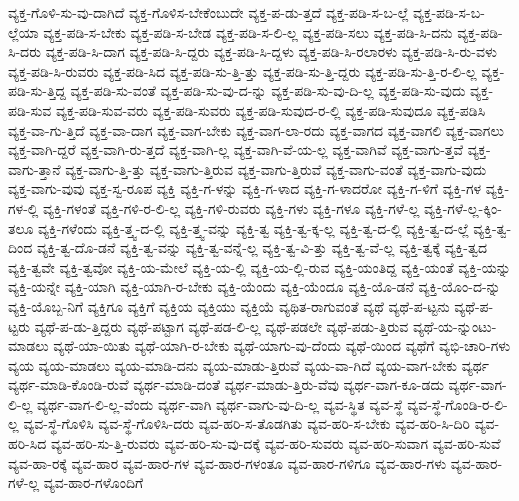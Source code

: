 {ವ್ಯಕ್ತ-ಗೊಳಿ-ಸು-ವು-ದಾಗಿದೆ
ವ್ಯಕ್ತ-ಗೊಳಿಸ-ಬೇಕೆಂಬುದೇ
ವ್ಯಕ್ತ-ಪ-ಡು-ತ್ತದೆ
ವ್ಯಕ್ತ-ಪಡಿ-ಸ-ಬ-ಲ್ಲೆ
ವ್ಯಕ್ತ-ಪಡಿ-ಸ-ಬ-ಲ್ಲೆಯಾ
ವ್ಯಕ್ತ-ಪಡಿ-ಸ-ಬೇಕು
ವ್ಯಕ್ತ-ಪಡಿ-ಸ-ಬೇಡ
ವ್ಯಕ್ತ-ಪಡಿ-ಸ-ಲಿ-ಲ್ಲ
ವ್ಯಕ್ತ-ಪಡಿ-ಸಲು
ವ್ಯಕ್ತ-ಪಡಿ-ಸಿ-ದನು
ವ್ಯಕ್ತ-ಪಡಿ-ಸಿ-ದರು
ವ್ಯಕ್ತ-ಪಡಿ-ಸಿ-ದಾಗ
ವ್ಯಕ್ತ-ಪಡಿ-ಸಿ-ದ್ದರು
ವ್ಯಕ್ತ-ಪಡಿ-ಸಿ-ದ್ದಳು
ವ್ಯಕ್ತ-ಪಡಿ-ಸಿ-ರಲಾರಳು
ವ್ಯಕ್ತ-ಪಡಿ-ಸಿ-ರು-ವಳು
ವ್ಯಕ್ತ-ಪಡಿ-ಸಿ-ರುವರು
ವ್ಯಕ್ತ-ಪಡಿ-ಸಿದ
ವ್ಯಕ್ತ-ಪಡಿ-ಸು-ತ್ತಿ-ತ್ತು
ವ್ಯಕ್ತ-ಪಡಿ-ಸು-ತ್ತಿ-ದ್ದರು
ವ್ಯಕ್ತ-ಪಡಿ-ಸು-ತ್ತಿ-ರ-ಲಿ-ಲ್ಲ
ವ್ಯಕ್ತ-ಪಡಿ-ಸು-ತ್ತಿದ್ದ
ವ್ಯಕ್ತ-ಪಡಿ-ಸು-ವಂತೆ
ವ್ಯಕ್ತ-ಪಡಿ-ಸು-ವು-ದ-ನ್ನು
ವ್ಯಕ್ತ-ಪಡಿ-ಸು-ವು-ದಿ-ಲ್ಲ
ವ್ಯಕ್ತ-ಪಡಿ-ಸು-ವುದು
ವ್ಯಕ್ತ-ಪಡಿ-ಸುವ
ವ್ಯಕ್ತ-ಪಡಿ-ಸುವ-ವರು
ವ್ಯಕ್ತ-ಪಡಿ-ಸುವರು
ವ್ಯಕ್ತ-ಪಡಿ-ಸುವುದ-ರ-ಲ್ಲಿ
ವ್ಯಕ್ತ-ಪಡಿ-ಸುವುದೂ
ವ್ಯಕ್ತ-ಪಡಿಸಿ
ವ್ಯಕ್ತ-ವಾ-ಗು-ತ್ತಿದೆ
ವ್ಯಕ್ತ-ವಾ-ದಾಗ
ವ್ಯಕ್ತ-ವಾಗ-ಬೇಕು
ವ್ಯಕ್ತ-ವಾಗ-ಲಾ-ರದು
ವ್ಯಕ್ತ-ವಾಗದ
ವ್ಯಕ್ತ-ವಾಗಲಿ
ವ್ಯಕ್ತ-ವಾಗಲು
ವ್ಯಕ್ತ-ವಾಗಿ-ದ್ದರೆ
ವ್ಯಕ್ತ-ವಾಗಿ-ರು-ತ್ತದೆ
ವ್ಯಕ್ತ-ವಾಗಿ-ಲ್ಲ
ವ್ಯಕ್ತ-ವಾಗಿ-ವೆ-ಯ-ಲ್ಲ
ವ್ಯಕ್ತ-ವಾಗಿವೆ
ವ್ಯಕ್ತ-ವಾಗು-ತ್ತವೆ
ವ್ಯಕ್ತ-ವಾಗು-ತ್ತಾನೆ
ವ್ಯಕ್ತ-ವಾಗು-ತ್ತಿ-ತ್ತು
ವ್ಯಕ್ತ-ವಾಗು-ತ್ತಿರುವ
ವ್ಯಕ್ತ-ವಾಗು-ತ್ತಿರುವೆ
ವ್ಯಕ್ತ-ವಾಗು-ವಂತೆ
ವ್ಯಕ್ತ-ವಾಗು-ವುದು
ವ್ಯಕ್ತ-ವಾಗು-ವುವು
ವ್ಯಕ್ತ-ಸ್ವ-ರೂಪ
ವ್ಯಕ್ತಿ
ವ್ಯಕ್ತಿ-ಗ-ಳನ್ನು
ವ್ಯಕ್ತಿ-ಗ-ಳಾದ
ವ್ಯಕ್ತಿ-ಗ-ಳಾದರೋ
ವ್ಯಕ್ತಿ-ಗ-ಳಿಗೆ
ವ್ಯಕ್ತಿ-ಗಳ
ವ್ಯಕ್ತಿ-ಗಳ-ಲ್ಲಿ
ವ್ಯಕ್ತಿ-ಗಳಂತೆ
ವ್ಯಕ್ತಿ-ಗಳಿ-ರ-ಲಿ-ಲ್ಲ
ವ್ಯಕ್ತಿ-ಗಳಿ-ರುವರು
ವ್ಯಕ್ತಿ-ಗಳು
ವ್ಯಕ್ತಿ-ಗಳೂ
ವ್ಯಕ್ತಿ-ಗಳೆ-ಲ್ಲ
ವ್ಯಕ್ತಿ-ಗಳೆ-ಲ್ಲ-ಕ್ಕಿಂ-ತಲೂ
ವ್ಯಕ್ತಿ-ಗಳೆಂದು
ವ್ಯಕ್ತಿ-ತ್ತ್ವ-ದ-ಲ್ಲಿ
ವ್ಯಕ್ತಿ-ತ್ತ್ವ-ವನ್ನು
ವ್ಯಕ್ತಿ-ತ್ವ
ವ್ಯಕ್ತಿ-ತ್ವ-ಕ್ಕ-ಲ್ಲ
ವ್ಯಕ್ತಿ-ತ್ವ-ದ-ಲ್ಲಿ
ವ್ಯಕ್ತಿ-ತ್ವ-ದ-ಲ್ಲೆ
ವ್ಯಕ್ತಿ-ತ್ವ-ದಿಂದ
ವ್ಯಕ್ತಿ-ತ್ವ-ದೊ-ಡನೆ
ವ್ಯಕ್ತಿ-ತ್ವ-ವನ್ನು
ವ್ಯಕ್ತಿ-ತ್ವ-ವನ್ನೆ-ಲ್ಲ
ವ್ಯಕ್ತಿ-ತ್ವ-ವಿ-ತ್ತು
ವ್ಯಕ್ತಿ-ತ್ವ-ವೆ-ಲ್ಲ
ವ್ಯಕ್ತಿ-ತ್ವಕ್ಕೆ
ವ್ಯಕ್ತಿ-ತ್ವದ
ವ್ಯಕ್ತಿ-ತ್ವವೇ
ವ್ಯಕ್ತಿ-ತ್ವವೋ
ವ್ಯಕ್ತಿ-ಯ-ಮೇಲೆ
ವ್ಯಕ್ತಿ-ಯ-ಲ್ಲಿ
ವ್ಯಕ್ತಿ-ಯ-ಲ್ಲಿ-ರುವ
ವ್ಯಕ್ತಿ-ಯಂತಿದ್ದ
ವ್ಯಕ್ತಿ-ಯಂತೆ
ವ್ಯಕ್ತಿ-ಯನ್ನು
ವ್ಯಕ್ತಿ-ಯನ್ನೇ
ವ್ಯಕ್ತಿ-ಯಾಗಿ
ವ್ಯಕ್ತಿ-ಯಾಗಿ-ರ-ಬೇಕು
ವ್ಯಕ್ತಿ-ಯೆಂದು
ವ್ಯಕ್ತಿ-ಯೆಂದೂ
ವ್ಯಕ್ತಿ-ಯೊ-ಡನೆ
ವ್ಯಕ್ತಿ-ಯೊಂ-ದ-ನ್ನು
ವ್ಯಕ್ತಿ-ಯೊಬ್ಬ-ನಿಗೆ
ವ್ಯಕ್ತಿಗೂ
ವ್ಯಕ್ತಿಗೆ
ವ್ಯಕ್ತಿಯ
ವ್ಯಕ್ತಿಯು
ವ್ಯಕ್ತಿಯೆ
ವ್ಯಥಿತ-ರಾಗುವಂತೆ
ವ್ಯಥೆ
ವ್ಯಥೆ-ಪ-ಟ್ಟನು
ವ್ಯಥೆ-ಪ-ಟ್ಟರು
ವ್ಯಥೆ-ಪ-ಡು-ತ್ತಿದ್ದರು
ವ್ಯಥೆ-ಪಟ್ಟಾಗ
ವ್ಯಥೆ-ಪಡ-ಲಿ-ಲ್ಲ
ವ್ಯಥೆ-ಪಡಲೇ
ವ್ಯಥೆ-ಪಡು-ತ್ತಿರುವ
ವ್ಯಥೆ-ಯ-ನ್ನುಂಟು-ಮಾಡಲು
ವ್ಯಥೆ-ಯಾ-ಯಿತು
ವ್ಯಥೆ-ಯಾಗಿ-ರ-ಬೇಕು
ವ್ಯಥೆ-ಯಾಗು-ವು-ದೆಂದು
ವ್ಯಥೆ-ಯಿಂದ
ವ್ಯಥೆಗೆ
ವ್ಯಭಿ-ಚಾರಿ-ಗಳು
ವ್ಯಯ
ವ್ಯಯ-ಮಾಡಲು
ವ್ಯಯ-ಮಾಡಿ-ದನು
ವ್ಯಯ-ಮಾಡು-ತ್ತಿರುವೆ
ವ್ಯಯ-ವಾ-ಗಿದೆ
ವ್ಯಯ-ವಾಗ-ಬೇಕು
ವ್ಯರ್ಥ
ವ್ಯರ್ಥ-ಮಾಡಿ-ಕೊಂಡಿ-ರುವೆ
ವ್ಯರ್ಥ-ಮಾಡಿ-ದಂತೆ
ವ್ಯರ್ಥ-ಮಾಡು-ತ್ತಿರು-ವೆವು
ವ್ಯರ್ಥ-ವಾಗ-ಕೂ-ಡದು
ವ್ಯರ್ಥ-ವಾಗ-ಲಿ-ಲ್ಲ
ವ್ಯರ್ಥ-ವಾಗ-ಲಿ-ಲ್ಲ-ವೆಂದು
ವ್ಯರ್ಥ-ವಾಗಿ
ವ್ಯರ್ಥ-ವಾಗು-ವು-ದಿ-ಲ್ಲ
ವ್ಯವ-ಸ್ಥಿತ
ವ್ಯವ-ಸ್ಥೆ
ವ್ಯವ-ಸ್ಥೆ-ಗೊಂಡಿ-ರ-ಲಿ-ಲ್ಲ
ವ್ಯವ-ಸ್ಥೆ-ಗೊಳಿಸಿ
ವ್ಯವ-ಸ್ಥೆ-ಗೊಳಿಸಿ-ದರು
ವ್ಯವ-ಹರಿ-ಸ-ತೊಡಗಿತು
ವ್ಯವ-ಹರಿ-ಸ-ಬೇಕು
ವ್ಯವ-ಹರಿ-ಸಿ-ದಿರಿ
ವ್ಯವ-ಹರಿ-ಸಿದ
ವ್ಯವ-ಹರಿ-ಸು-ತ್ತಿ-ರುವರು
ವ್ಯವ-ಹರಿ-ಸು-ವು-ದಕ್ಕೆ
ವ್ಯವ-ಹರಿ-ಸುವರು
ವ್ಯವ-ಹರಿ-ಸುವಾಗ
ವ್ಯವ-ಹರಿ-ಸುವೆ
ವ್ಯವ-ಹಾ-ರಕ್ಕೆ
ವ್ಯವ-ಹಾರ
ವ್ಯವ-ಹಾರ-ಗಳ
ವ್ಯವ-ಹಾರ-ಗಳಂತೂ
ವ್ಯವ-ಹಾರ-ಗಳಿಗೂ
ವ್ಯವ-ಹಾರ-ಗಳು
ವ್ಯವ-ಹಾರ-ಗಳೆ-ಲ್ಲ
ವ್ಯವ-ಹಾರ-ಗಳೊಂದಿಗೆ
}
